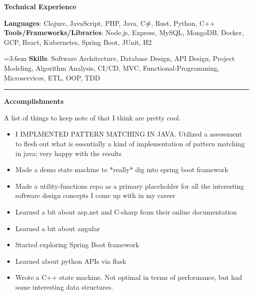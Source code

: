 \documentclass[letterpaper,11pt]{article}
\newcommand{\resumeItem}[1]{
  \item\small{
    {#1 \vspace{-2pt}}
  }
}
\newcommand{\resumeItemListStart}{\begin{itemize}}
\newcommand{\resumeItemListEnd}{\end{itemize}\vspace{-5pt}}
\begin{document}
%
\textbf{\large \textcolor{magic_blue}{Technical Experience} }
\begin{onehalfspace}

	\textbf{ Languages}{: Clojure, JavaScript, PHP, Java, C\#, Rust, Python, C++ } \\

	\textbf{ Tools/Frameworks/Libraries}{: Node.js, Express, MySQL, MongoDB, Docker, GCP, React, Kubernetes, Spring Boot, JUnit, H2 } \\
\end{onehalfspace}

\hangindent=3.6em
\textbf{ Skills}{: }
Software Architecture, Database Design, API Design,
Project Modeling, Algorithm Analysis, CI/CD,
MVC, Functional-Programming, Microservices, ETL, OOP,
TDD

\noindent\rule{19.5cm}{0.4pt}


\textbf{\large \textcolor{magic_blue}{Accomplishments} }

A list of things to keep note of that I think are pretty cool.

\resumeItemListStart
\resumeItem{ I IMPLMENTED PATTERN MATCHING IN JAVA. Utilized a assessment to flesh out what is
	essentially a kind of implementation of pattern matching
	in java; very happy with the results }
\resumeItemListEnd

\resumeItemListStart
\resumeItem{ Made a demo state machine to *really* dig
	into spring boot framework }
\resumeItemListEnd

\resumeItemListStart
\resumeItem{ Made a utility-functions repo as a primary
	placeholder for all the interesting software design concepts
	I come up with in my career }
\resumeItemListEnd

\resumeItemListStart
\resumeItem{ Learned a bit about asp.net and C-sharp from
	their online documentation }
\resumeItemListEnd

\resumeItemListStart
\resumeItem{ Learned a bit about angular }
\resumeItemListEnd

\resumeItemListStart
\resumeItem{ Started exploring Spring Boot framework }
\resumeItemListEnd

\resumeItemListStart
\resumeItem{ Learned about python APIs via flask }
\resumeItemListEnd

\resumeItemListStart
\resumeItem{ Wrote a C++ state machine. Not optimal in terms
	of performance, but had some interesting data structures. }
\resumeItemListEnd
\end{document}
